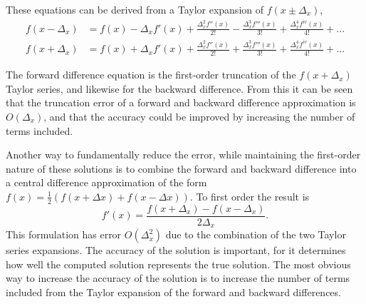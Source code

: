These equations can be derived from a Taylor expansion of $f(x\pm\Delta_{x})$,
\begin{align}
f(x-\Delta_{x}) & = f(x)-\Delta_{x}f'(x)+\frac{\Delta_{x}^{2}f''(x)}{2!}-\frac{\Delta_{x}^{3}f'''(x)}{3!}+\frac{\Delta_{x}^{4}f^{iv}(x)}{4!}+...\label{eq:TaylorForward}\\
f(x+\Delta_{x}) & = f(x)+\Delta_{x}f'(x)+\frac{\Delta_{x}^{2}f''(x)}{2!}+\frac{\Delta_{x}^{3}f'''(x)}{3!}+\frac{\Delta_{x}^{4}f^{iv}(x)}{4!}+...\label{eq:TaylorBackward}
\end{align}


The forward difference equation is the first-order truncation of the $f(x+\Delta_{x})$ Taylor series, and likewise for the backward difference.
From this it can be seen that the truncation error of a forward and backward difference approximation is $O(\Delta_{x})$, and that the accuracy could be improved by increasing the number of terms included.

Another way to fundamentally reduce the error, while maintaining the first-order nature of these solutions is to combine the forward and backward difference into a central difference approximation of the form  $f(x)=\frac{1}{2} \left(f(x + \Delta x) + f(x - \Delta x)\right)$.
To first order the result is 
\begin{equation}
f'(x)=\frac{f(x+\Delta_{x})-f(x-\Delta_{x})}{2\Delta_{x}}.\label{eq:First Order CD}
\end{equation}
This formulation has error $O(\Delta_{x}^{2})$ due to the combination of the two Taylor series expansions.
The accuracy of the solution is important, for it determines how well the computed solution represents the true solution.
The most obvious way to increase the accuracy of the solution is to increase the number of terms included from the Taylor expansion of the forward and backward differences.

